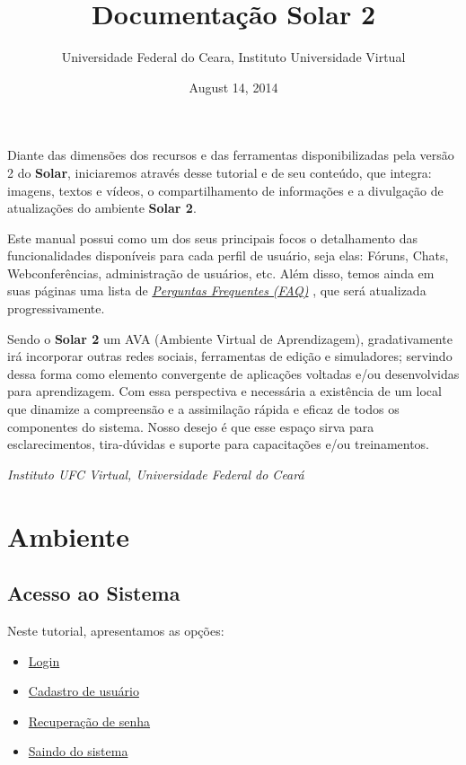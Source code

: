 \documentclass[letterpaper,10pt,english]{sphinxmanual}
\title{Documentação Solar 2}
\date{August 14, 2014}
\author{Universidade Federal do Ceara, Instituto Universidade Virtual}
\begin{document}
\maketitle
\tableofcontents
{}\label{index::doc}


Diante das dimensões dos recursos e das ferramentas disponibilizadas pela versão 2 do \textbf{Solar}, iniciaremos através desse tutorial e de seu conteúdo, que integra: imagens, textos e vídeos, o compartilhamento de informações e a divulgação de atualizações do ambiente \textbf{Solar 2}.

Este manual possui como um dos seus principais focos o detalhamento das funcionalidades disponíveis para cada perfil de usuário, seja elas: Fóruns, Chats, Webconferências, administração de usuários, etc. Além disso, temos ainda em suas páginas uma lista de {\hyperref[faq::doc]{\emph{Perguntas Frequentes (FAQ)}}} , que será atualizada progressivamente.

Sendo o \textbf{Solar 2} um AVA (Ambiente Virtual de Aprendizagem), gradativamente irá incorporar outras redes sociais, ferramentas de edição e simuladores; servindo dessa forma como elemento convergente de aplicações voltadas e/ou desenvolvidas para aprendizagem. Com essa perspectiva e necessária a existência de um local que dinamize a compreensão e a assimilação rápida e eficaz de todos os componentes do sistema.
Nosso desejo é que esse espaço sirva para esclarecimentos, tira-dúvidas e suporte para capacitações e/ou treinamentos.

\emph{Instituto UFC Virtual, Universidade Federal do Ceará}


\chapter{Ambiente}
\label{index:projeto-solar-2-0}\label{index:ambiente}

\section{Acesso ao Sistema}
\label{access:access}\label{access:acesso-ao-sistema}\label{access::doc}
Neste tutorial, apresentamos as opções:
\begin{itemize}
\item {} 
{\hyperref[access:login]{Login}}

\item {} 
{\hyperref[access:cadastro-de-usuario]{Cadastro de usuário}}

\item {} 
{\hyperref[access:recuperacao-de-senha]{Recuperação de senha}}

\item {} 
{\hyperref[access:saindo-do-sistema]{Saindo do sistema}}

\end{itemize}
\end{document}

